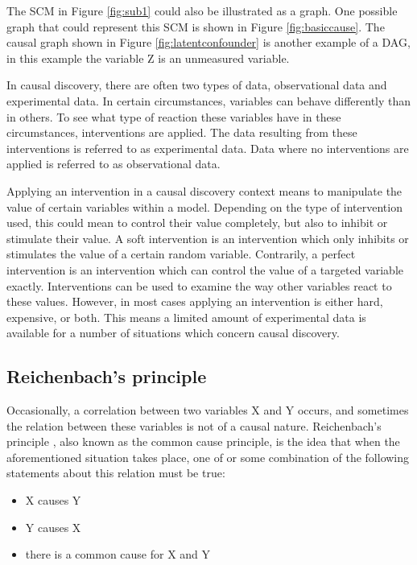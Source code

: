 \documentclass[a4paper,pdf]{article}
\begin{document}
The SCM in Figure \ref{fig:sub1} could also be illustrated as a graph. One possible graph that could represent this SCM is shown in Figure \ref{fig:basiccause}. The causal graph shown in Figure \ref{fig:latentconfounder} is another example of a DAG, in this example the variable Z is an unmeasured variable. 



In causal discovery, there are often two types of data, observational data and experimental data. In certain circumstances, variables can behave differently than in others. To see what type of reaction these variables have in these circumstances, interventions are applied. The data resulting from these interventions is referred to as experimental data. Data where no interventions are applied is referred to as observational data.

Applying an intervention in a causal discovery context means to manipulate the value of certain variables within a model. Depending on the type of intervention used, this could mean to control their value completely, but also to inhibit or stimulate their value. A soft intervention is an intervention which only inhibits or stimulates the value of a certain random variable. Contrarily, a perfect intervention is an intervention which can control the value of a targeted variable exactly. Interventions can be used to examine the way other variables react to these values. However, in most cases applying an intervention is either hard, expensive, or both. This means a limited amount of experimental data is available for a number of situations which concern causal discovery.


\subsection{Reichenbach's principle}
Occasionally, a correlation between two variables X and Y occurs, and sometimes the relation between these variables is not of a causal nature. Reichenbach's principle \cite{Reichenbach1956}, also known as the common cause principle, is the idea that when the aforementioned situation takes place, one of or some combination of the following statements about this relation must be true:\\
\begin{itemize}
    \item X causes Y
    \item Y causes X 
    \item there is a common cause for X and Y
\end{itemize}
\end{document}

